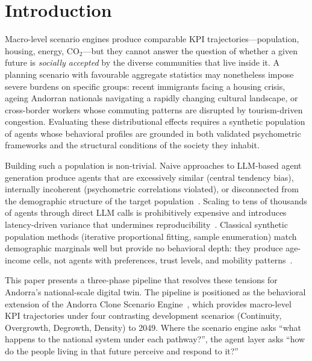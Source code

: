 \documentclass[sustainability,article,submit,pdftex,moreauthors]{Definitions/mdpi}
\begin{document}
\section{Introduction}
\label{sec:introduction}

Macro-level scenario engines produce comparable KPI trajectories---population,
housing, energy, CO$_2$---but they cannot answer the question of whether a
given future is \emph{socially accepted} by the diverse communities that live
inside it. A planning scenario with favourable aggregate statistics may
nonetheless impose severe burdens on specific groups: recent immigrants facing
a housing crisis, ageing Andorran nationals navigating a rapidly changing
cultural landscape, or cross-border workers whose commuting patterns are
disrupted by tourism-driven congestion. Evaluating these distributional
effects requires a synthetic population of agents whose behavioral profiles
are grounded in both validated psychometric frameworks and the structural
conditions of the society they inhabit.

Building such a population is non-trivial. Naive approaches to LLM-based
agent generation produce agents that are excessively similar (central tendency
bias), internally incoherent (psychometric correlations violated), or
disconnected from the demographic structure of the target
population~\cite{argyle2023outstuffing,park2023generative}. Scaling to tens
of thousands of agents through direct LLM calls is prohibitively expensive and
introduces latency-driven variance that undermines
reproducibility~\cite{adornetto2025generative}. Classical synthetic population
methods (iterative proportional fitting, sample enumeration) match demographic
marginals well but provide no behavioral depth: they produce age-income cells,
not agents with preferences, trust levels, and mobility
patterns~\cite{muller2021synthetic,axhausen2016population}.

This paper presents a three-phase pipeline that resolves these tensions for
Andorra's national-scale digital twin. The pipeline is positioned as the
behavioral extension of the Andorra Clone Scenario Engine~\cite{bartumeu2026andorra},
which provides macro-level KPI trajectories under four contrasting development
scenarios (Continuity, Overgrowth, Degrowth, Density) to 2049. Where the
scenario engine asks ``what happens to the national system under each
pathway?'', the agent layer asks ``how do the people living in that future
perceive and respond to it?''
\end{document}
